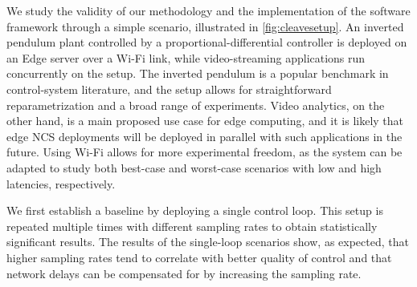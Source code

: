 \medskip
We study the validity of our methodology and the implementation of the software framework through a simple scenario, illustrated in \cref{fig:cleavesetup}.
An inverted pendulum plant controlled by a proportional-differential controller is deployed on an Edge server over a Wi-Fi link, while video-streaming applications run concurrently on the setup.
The inverted pendulum is a popular benchmark in control-system literature, and the setup allows for straightforward reparametrization and a broad range of experiments.
Video analytics, on the other hand, is a main proposed use case for edge computing, and it is likely that edge \gls{NCS} deployments will be deployed in parallel with such applications in the future.
Using Wi-Fi allows for more experimental freedom, as the system can be adapted to study both best-case and worst-case scenarios with low and high latencies, respectively.

We first establish a baseline by deploying a single control loop.
This setup is repeated multiple times with different sampling rates to obtain statistically significant results.
The results of the single-loop scenarios show, as expected, that higher sampling rates tend to correlate with better quality of control and that network delays can be compensated for by increasing the sampling rate.

